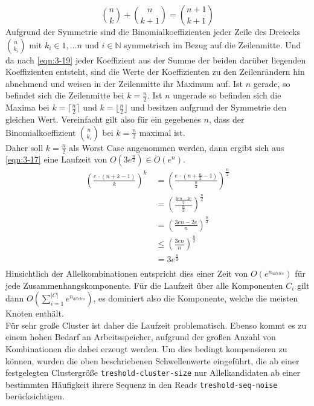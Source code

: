 \begin{equation} \label{eqn:3-19}
\tag{3-19}
\binom{n}{k} + \binom{n}{k + 1} = \binom{n + 1}{k + 1} 
\end{equation} 
Aufgrund der Symmetrie sind die Binomialkoeffizienten jeder Zeile des Dreiecks $\binom{n}{k_{i}}$ mit $ k_{i} \in 1, \dots n $ und $ i \in \mathds{N} $ symmetrisch im Bezug auf die Zeilenmitte. Und da nach \eqref{eqn:3-19} jeder Koeffizient aus der Summe der beiden darüber liegenden Koeffizienten entsteht, sind die Werte der Koeffizienten zu den Zeilenrändern hin abnehmend und weisen in der Zeilenmitte ihr Maximum auf. Ist $n$ gerade, so befindet sich die Zeilenmitte bei $ k = \frac{n}{2} $. Ist $n$ ungerade so befinden sich die Maxima bei $ k = \lceil \frac{n}{2} \rceil $ und $ k = \lfloor \frac{n}{2} \rfloor $ und besitzen aufgrund der Symmetrie den gleichen Wert. Vereinfacht gilt also für ein gegebenes $n$, dass der Binomialkoeffizient $\binom{n}{k_{i}}$ bei $ k = \frac{n}{2} $ maximal ist. \\

Daher soll $ k = \frac{n}{2} $ als Worst Case angenommen werden, dann ergibt sich aus \eqref{eqn:3-17} eine Laufzeit von $ O(3e^{\frac{n}{2}} ) \in O(e^n) $. 
\begin{equation} \label{eqn:3-20}
\tag{3-20}
\begin{aligned}
\left( \frac{e \, \cdotp (n + k - 1)}{k}\right)^k &\ {} = \left( \frac{e \, \cdotp (n + \frac{n}{2} - 1)}{\frac{n}{2}}\right)^{\frac{n}{2}}  \\
&\ = \left( \frac{\frac{3en - 2e}{2}} {\frac{n}{2}}\right)^{\frac{n}{2}} \\
&\ = \left( \frac{3en - 2e}{n}\right)^{\frac{n}{2}} \\
&\ \leq \left( \frac{3en}{n}\right)^{\frac{n}{2}}\\
&\ = 3e^{\frac{n}{2}}\\
\end{aligned}
\end{equation}
Hinsichtlich der Allelkombinationen entspricht dies einer Zeit von $ O(e^{n_{alleles}}) $ für jede Zusammenhangskomponente. Für die Laufzeit über alle Komponenten $C_{i}$ gilt dann \linebreak $O\left( \sum\limits_{i=1}^{|C|}e^{n_{alleles}}\right) $, es dominiert also die Komponente, welche die meisten Knoten enthält. \\

Für sehr große Cluster ist daher die Laufzeit problematisch. Ebenso kommt es zu einem hohen Bedarf an Arbeitsspeicher, aufgrund der großen Anzahl von Kombinationen die dabei erzeugt werden. Um dies bedingt kompensieren zu können, wurden die oben beschriebenen Schwellenwerte eingeführt, die ab einer festgelegten Clustergröße \lstinline|treshold-cluster-size| nur Allelkandidaten ab einer bestimmten Häufigkeit ihrere Sequenz in den Reads \linebreak \lstinline|treshold-seq-noise| berücksichtigen.\\

